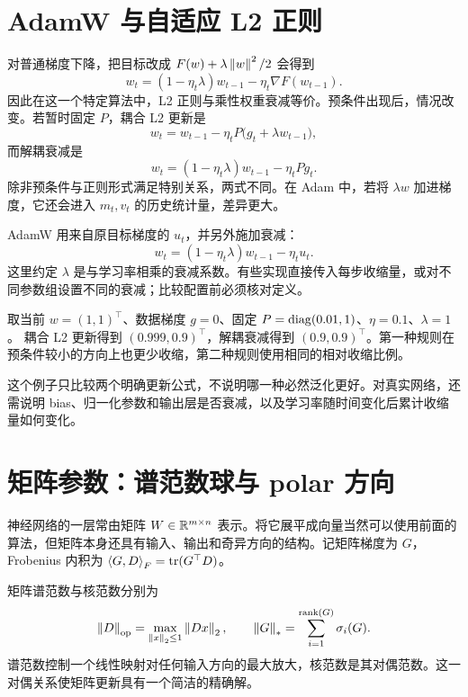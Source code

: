 \section{AdamW 与自适应 L2 正则}
\label{l4:adamw}

对普通梯度下降，把目标改成 $F(w)+\lambda\left\lVert w\right\rVert^2/2$ 会得到
\[
 w_t=(1-\eta_t\lambda)w_{t-1}-\eta_t\nabla F(w_{t-1}).
\]
因此在这一个特定算法中，L2 正则与乘性权重衰减等价。预条件出现后，情况改变。若暂时固定 $P$，耦合 L2 更新是
\begin{equation}
 w_t=w_{t-1}-\eta_tP\bigl(g_t+\lambda w_{t-1}\bigr),
 \label{l4:coupled-l2}
\end{equation}
而解耦衰减是
\begin{equation}
 w_t=(1-\eta_t\lambda)w_{t-1}-\eta_tPg_t.
 \label{l4:decoupled-decay}
\end{equation}
除非预条件与正则形式满足特别关系，两式不同。在 Adam 中，若将 $\lambda w$ 加进梯度，它还会进入 $m_t,v_t$ 的历史统计量，差异更大。

AdamW 用来自原目标梯度的 $u_t$，并另外施加衰减\citep{Loshchilov2019}：
\begin{equation}
 \boxed{w_t=(1-\eta_t\lambda)w_{t-1}-\eta_tu_t}.
 \label{l4:adamw-rule}
\end{equation}
这里约定 $\lambda$ 是与学习率相乘的衰减系数。有些实现直接传入每步收缩量，或对不同参数组设置不同的衰减；比较配置前必须核对定义。

\begin{example}[两种正则化的收缩不同]
取当前 $w=(1,1)^\top$、数据梯度 $g=0$、固定
$P=\operatorname{diag}(0.01,1)$、$\eta=0.1$、$\lambda=1$。
耦合 L2 更新得到 $(0.999,0.9)^\top$，解耦衰减得到 $(0.9,0.9)^\top$。第一种规则在预条件较小的方向上也更少收缩，第二种规则使用相同的相对收缩比例。

这个例子只比较两个明确更新公式，不说明哪一种必然泛化更好。对真实网络，还需说明 bias、归一化参数和输出层是否衰减，以及学习率随时间变化后累计收缩量如何变化。
\end{example}

\section{矩阵参数：谱范数球与 polar 方向}
\label{l4:spectral-ball}

神经网络的一层常由矩阵 $W\in\mathbb R^{m\times n}$ 表示。将它展平成向量当然可以使用前面的算法，但矩阵本身还具有输入、输出和奇异方向的结构。记矩阵梯度为 $G$，Frobenius 内积为
$\left\langle G,D\right\rangle_F=\operatorname{tr}(G^\top D)$。

矩阵谱范数与核范数分别为
\[
 \left\lVert D\right\rVert_{\rm op}=\max_{\left\lVert x\right\rVert_2\leq1}\left\lVert Dx\right\rVert_2,
 \qquad
 \left\lVert G\right\rVert_*=\sum_{i=1}^{\operatorname{rank}(G)}\sigma_i(G).
\]
谱范数控制一个线性映射对任何输入方向的最大放大，核范数是其对偶范数。这一对偶关系使矩阵更新具有一个简洁的精确解。

